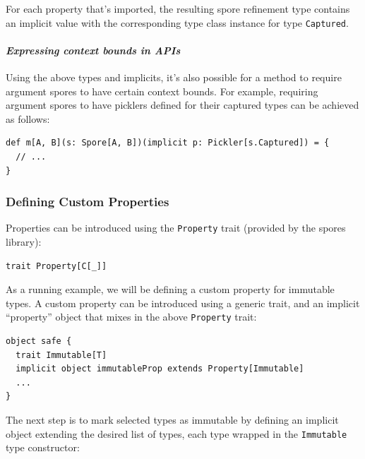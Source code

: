 \documentclass{llncs}
\begin{document}
For each property that's imported, the resulting spore refinement type
contains an implicit value with the corresponding type class instance for type
\verb|Captured|.




\paragraph{\textbf{\textit{Expressing context bounds in APIs}}}

Using the above types and implicits, it's also possible for a method
to require argument spores to have certain context bounds. For example,
requiring argument spores to have picklers defined for their captured types
can be achieved as follows:

\begin{lstlisting}
def m[A, B](s: Spore[A, B])(implicit p: Pickler[s.Captured]) = {
  // ...
}
\end{lstlisting}


\subsubsection{Defining Custom Properties}

Properties can be introduced using the \verb|Property| trait (provided by the
spores library):

\begin{lstlisting}[numbers=none]
    trait Property[C[_]]
\end{lstlisting}

As a running example, we will be defining a custom  property for
immutable types. A custom property can be introduced using a generic trait,
and an implicit ``property'' object that mixes in the above \verb|Property|
trait:

\begin{lstlisting}
object safe {
  trait Immutable[T]
  implicit object immutableProp extends Property[Immutable]
  ...
}
\end{lstlisting}
\noindent
The next step is to mark selected types as immutable by defining an implicit object extending the desired list of types, each type wrapped in the \verb|Immutable| type constructor:
\end{document}
